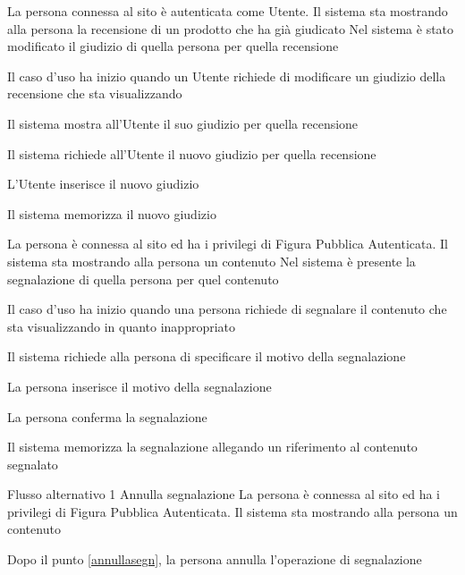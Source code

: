 {}
{La persona connessa al sito è autenticata  come Utente. Il sistema sta mostrando alla persona la recensione di un prodotto che ha già giudicato}
{Nel sistema è stato modificato il giudizio di quella persona per quella recensione}
{\begin{enumCU}
	\item Il caso d'uso ha inizio quando un Utente richiede di modificare un giudizio della recensione che sta visualizzando
	\item Il sistema mostra all'Utente il suo giudizio per quella recensione
	\item Il sistema richiede all'Utente il nuovo giudizio per quella recensione
	\item L'Utente inserisce il nuovo giudizio
	\item Il sistema memorizza il nuovo giudizio
\end{enumCU}}


{}
{La persona è connessa al sito ed ha i privilegi di Figura Pubblica Autenticata. Il sistema sta mostrando alla persona un \gls{contenuto}}
{Nel sistema è presente la segnalazione di quella persona per quel \gls{contenuto}}
{\begin{enumCU}
	\item Il caso d'uso ha inizio quando una persona richiede di segnalare il \gls{contenuto} che sta visualizzando in quanto inappropriato
	\item Il sistema richiede alla persona di specificare il motivo della segnalazione
	\item La persona inserisce il motivo della segnalazione\label{annullasegn}
	\item La persona conferma la segnalazione
	\item Il sistema memorizza la segnalazione allegando un \gls{riferimento} al \gls{contenuto} segnalato
\end{enumCU}}
%
{Flusso alternativo 1}%
{Annulla segnalazione}%
{La persona è connessa al sito ed ha i privilegi di Figura Pubblica Autenticata. Il sistema sta mostrando alla persona un \gls{contenuto}}
{\postNulle}%
{\begin{enumCU}
		\item Dopo il punto \ref{annullasegn}, la persona annulla l'operazione di segnalazione
	\end{enumCU}}%

